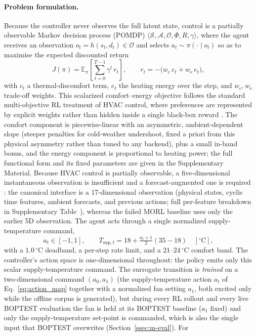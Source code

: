 \paragraph{Problem formulation.}
Because the controller never observes the full latent state, control is a partially
observable Markov decision process (POMDP)
$\langle \mathcal{S},\mathcal{A},\mathcal{O},\Phi,R,\gamma\rangle$, where the agent
receives an observation $o_t=h(s_t,d_t)\in\mathcal{O}$ and selects $a_t\sim\pi(\cdot\mid o_t)$
so as to maximise the expected discounted return~\citep{Sutton2018RL}
\begin{equation}
J(\pi)=\mathbb{E}_{\pi}\!\left[\sum_{t=0}^{T-1}\gamma^{t}\,r_t\right],
\qquad
r_t = -\big(w_{\mathrm{c}}\,c_t + w_{\mathrm{e}}\,e_t\big),
\label{eq:m-return}
\end{equation}
with $c_t$ a thermal-discomfort term, $e_t$ the heating energy over the step, and
$w_{\mathrm{c}},w_{\mathrm{e}}$ trade-off weights. This scalarized comfort--energy objective follows the standard multi-objective RL treatment of HVAC control, where preferences are represented by explicit weights rather than hidden inside a single black-box reward \citep{Roijers2013MOSurvey,Yang2019MORL,Hayes2022MOSurvey}. The comfort component is piecewise-linear with an asymmetric, ambient-dependent slope (steeper penalties for cold-weather undershoot, fixed a priori from this physical asymmetry rather than tuned to any backend), plus a small in-band bonus, and the energy component is proportional to heating power; the full functional form and its fixed parameters are given in the Supplementary Material. Because HVAC control is partially observable, a five-dimensional instantaneous observation is insufficient and a forecast-augmented one is required \citep{Gao2024Predictive}: the canonical interface is a 17-dimensional observation (physical states, cyclic time features, ambient forecasts, and previous actions; full per-feature breakdown in Supplementary Table~), whereas the failed MORL baseline uses only the earlier 5D observation. The agent acts through a single normalized supply-temperature command,
\begin{equation}
 a_t \in [-1,1],
 \qquad
 T_{\mathrm{sup},t} = 18 + \tfrac{a_t+1}{2}(35-18)\quad [^\circ\mathrm{C}],
 \label{eq:action_map}
\end{equation}
with a $1.0\,^\circ$C deadband, a per-step rate limit, and a $21$--$24\,^\circ$C comfort band. The controller's action space is one-dimensional throughout: the policy emits only this scalar supply-temperature command. The surrogate transition is \emph{trained} on a two-dimensional command $(a_0,a_1)$ (the supply-temperature action $a_t$ of Eq.~\eqref{eq:action_map} together with a normalized fan setting $a_1$, both excited only while the offline corpus is generated), but during every RL rollout and every live BOPTEST evaluation the fan is held at its BOPTEST baseline ($a_1$ fixed) and only the supply-temperature set-point is commanded, which is also the single input that BOPTEST overwrites (Section~\ref{ssec:m-eval}). For
